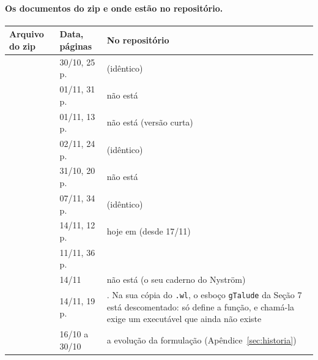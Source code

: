 \paragraph{Os documentos do zip e onde estão no repositório.}
\begin{center}\small
\begin{longtable}{@{}L{5.6cm} L{2.6cm} L{7.4cm}@{}}
\toprule
Arquivo do zip & Data, páginas & No repositório \\
\midrule
\endhead
{} & 30/10, 25 p. &  (idêntico) \\
 & 01/11, 31 p. & não está \\
 & 01/11, 13 p. & não está (versão curta) \\
 & 02/11, 24 p. &  (idêntico) \\
 & 31/10, 20 p. & não está \\
 & 07/11, 34 p. &  (idêntico) \\
 & 14/11, 12 p. & hoje em  (desde 17/11) \\
 & 11/11, 36 p. &  \\
 & 14/11 & não está (o seu caderno do Nyström) \\
 & 14/11, 19 p. & . Na sua cópia do \texttt{.wl}, o esboço
  \texttt{gTalude} da Seção 7 está descomentado: só define a função, e chamá-la exige um executável que ainda não existe \\
 & 16/10 a 30/10 & a evolução da formulação (Apêndice~\ref{sec:historia}) \\
\bottomrule
\end{longtable}
\end{center}
